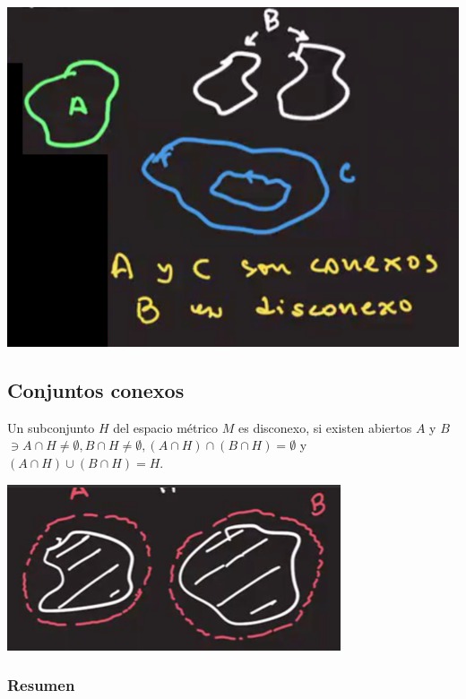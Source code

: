 	\begin{center}
	\includegraphics[scale=0.4]{images/2/14}
\end{center}

\subsection{Conjuntos conexos}

\begin{definicion}
	Un subconjunto $H$ del espacio métrico $M$ es disconexo, si existen abiertos $A$ y $B$ $\ni A\cap H\neq \emptyset, B\cap H\neq \emptyset, (A\cap H)\cap (B\cap H)=\emptyset$ y $(A\cap H)\cup (B\cap H)=H$. 
\end{definicion}

	\begin{center}
	\includegraphics[scale=0.4]{images/2/15}
\end{center}

\subsubsection{Resumen}

